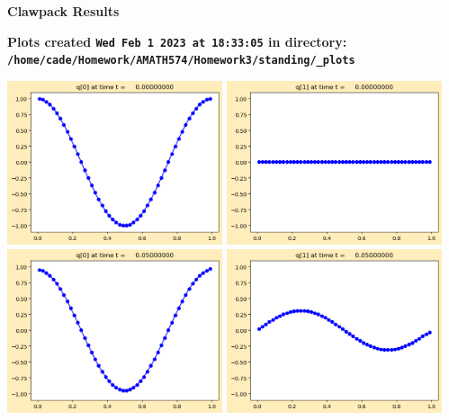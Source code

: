 \documentclass[11pt]{article}
\begin{document}
        \begin{center}{\Large\bf Clawpack Results}\vskip 5pt
        
        \bf Plots created {\tt Wed Feb  1 2023 at 18:33:05} in directory: \vskip 5pt
        \verb+/home/cade/Homework/AMATH574/Homework3/standing/_plots+
        \end{center}
        \vskip 5pt
        \includegraphics[width=0.475\textwidth]{frame0000fig0.png}
\includegraphics[width=0.475\textwidth]{frame0000fig1.png}
\vskip 10pt 
\includegraphics[width=0.475\textwidth]{frame0001fig0.png}
\includegraphics[width=0.475\textwidth]{frame0001fig1.png}
\end{document}
